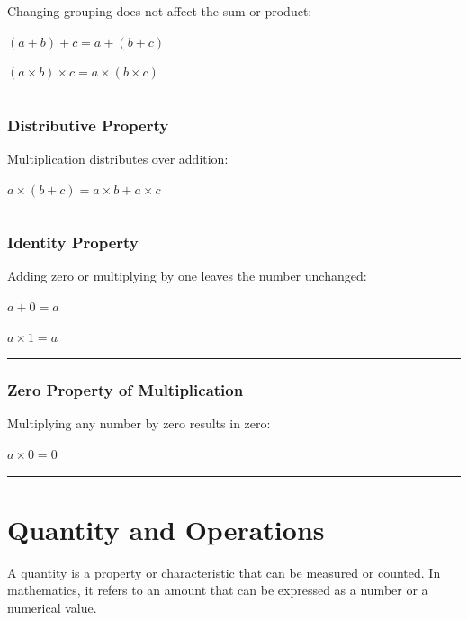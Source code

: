 \documentclass[
  letterpaper,
  DIV=11,
  numbers=noendperiod]{scrartcl}
\begin{document}
Changing grouping does not affect the sum or product:

\((a + b) + c = a + (b + c)\)

\((a \times b) \times c = a \times (b \times c)\)

\begin{center}\rule{0.5\linewidth}{0.5pt}\end{center}

\subsubsection{Distributive Property}\label{distributive-property}

Multiplication distributes over addition:

\(a \times (b + c) = a \times b + a \times c\)

\begin{center}\rule{0.5\linewidth}{0.5pt}\end{center}

\subsubsection{Identity Property}\label{identity-property}

Adding zero or multiplying by one leaves the number unchanged:

\(a + 0 = a\)

\(a \times 1 = a\)

\begin{center}\rule{0.5\linewidth}{0.5pt}\end{center}

\subsubsection{Zero Property of
Multiplication}\label{zero-property-of-multiplication}

Multiplying any number by zero results in zero:

\(a \times 0 = 0\)

\begin{center}\rule{0.5\linewidth}{0.5pt}\end{center}

\section{Quantity and Operations}\label{quantity-and-operations}

\begin{tcolorbox}[enhanced jigsaw, toptitle=1mm, bottomtitle=1mm, breakable, toprule=.15mm, colbacktitle=quarto-callout-note-color!10!white, left=2mm, bottomrule=.15mm, titlerule=0mm, leftrule=.75mm, rightrule=.15mm, opacityback=0, coltitle=black, title={Quantity}, opacitybacktitle=0.6, colback=white, arc=.35mm, colframe=quarto-callout-note-color-frame]

A quantity is a property or characteristic that can be measured or
counted. In mathematics, it refers to an amount that can be expressed as
a number or a numerical value.

\end{tcolorbox}
\end{document}
